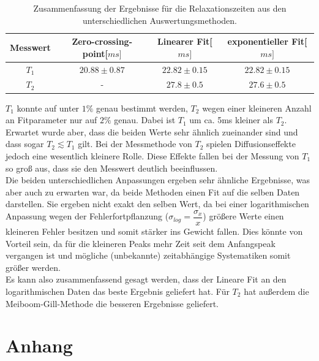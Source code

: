 \documentclass[12pt,a4paper]{article}
\begin{document}
\begin{table}[H]
\centering
\begin{tabular}{|c|c|c|c|}
\hline
Messwert & Zero-crossing-point[$ms]$ &Linearer Fit[$ms]$ & exponentieller Fit[$ms]$\\
\hline
$T_1$ & $20.88\pm 0.87$ & $22.82\pm 0.15$ & $22.82\pm 0.15$\\
\hline
$T_2$ & - & $27.8\pm 0.5$ & $27.6\pm 0.5$\\
\hline
\end{tabular}
\caption{Zusammenfassung der Ergebnisse für die Relaxationszeiten aus den unterschiedlichen Auswertungsmethoden.}
\label{GesamtZusammenfassung}
\end{table}
$T_1$ konnte auf unter $1\%$ genau bestimmt werden, $T_2$ wegen einer kleineren Anzahl an Fitparameter nur auf $2\%$ genau. Dabei ist $T_1$ um ca. 5ms kleiner als $T_2$.\\
Erwartet wurde aber, dass die beiden Werte sehr ähnlich zueinander sind und dass sogar $T_2 \lesssim T_1$ gilt. Bei der Messmethode von $T_2$ spielen Diffusionseffekte jedoch eine wesentlich kleinere Rolle. Diese Effekte fallen bei der Messung von $T_1$ so groß aus, dass sie den Messwert deutlich beeinflussen.\\
Die beiden unterschiedlichen Anpassungen ergeben sehr ähnliche Ergebnisse, was aber auch zu erwarten war, da beide Methoden einen Fit auf die selben Daten darstellen. Sie ergeben nicht exakt den selben Wert, da bei einer logarithmischen Anpassung wegen der Fehlerfortpflanzung ($\sigma_{log} = \dfrac{\sigma_x}{x}$) größere Werte einen kleineren Fehler besitzen und somit stärker ins Gewicht fallen. Dies könnte von Vorteil sein, da für die kleineren Peaks mehr Zeit seit dem Anfangspeak vergangen ist und mögliche (unbekannte) zeitabhängige Systematiken somit größer werden.\\
Es kann also zusammenfassend gesagt werden, dass der Lineare Fit an den logarithmischen Daten das beste Ergebnis geliefert hat. Für $T_2$ hat außerdem die Meiboom-Gill-Methode die besseren Ergebnisse geliefert.

\newpage

\section{Anhang}
\end{document}
